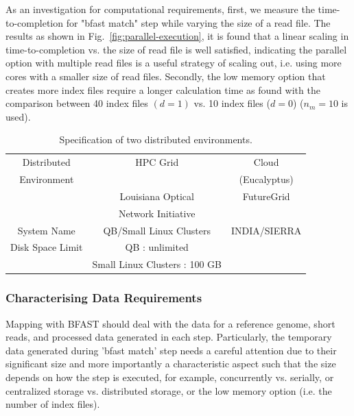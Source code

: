 \documentclass{acm_proc_article-sp}
\begin{document}
As an investigation for computational requirements, first, we measure the time-to-completion for "bfast match" step while varying the size of a read file.  The results as shown in Fig.~\ref{fig:parallel-execution}, it is found that a linear scaling in time-to-completion vs. the size of read file is well satisfied, indicating the parallel option with multiple read files is a useful strategy of scaling out, i.e.  using more cores with a smaller size of read files.  Secondly, the low memory option that creates more index files require a longer calculation time as found with the comparison between 40 index files $(d = 1)$ vs. 10 index files ($ d = 0 $) ($n_m = 10$ is used).   




 \begin{table}
 \begin{tabular}{|c|cc|} 
 \hline 
Distributed &  HPC Grid &  Cloud \\ 
Environment && (Eucalyptus)\\
\hline
 &  Louisiana Optical & FutureGrid \\
& Network Initiative  & \\
System  Name &  QB/Small Linux Clusters   &  INDIA/SIERRA \\
Disk Space  Limit  &  QB : unlimited  &    \\
                         &  Small Linux Clusters : 100 GB  &  \\
 \hline
 \end{tabular}
\caption{Specification of two distributed environments.  }
\label{table:two-systems} 
\end{table}
 
\subsubsection{Characterising Data Requirements}


Mapping with BFAST should deal with the data for a reference genome, short reads, and processed data generated in each step.  Particularly, the temporary data generated during 'bfast match' step needs a careful attention due to their significant size and more importantly a characteristic aspect such that the size depends on how the step is executed, for example, concurrently vs. serially, or centralized storage vs. distributed storage, or the low memory option (i.e. the number of index files).
   
\end{document}

